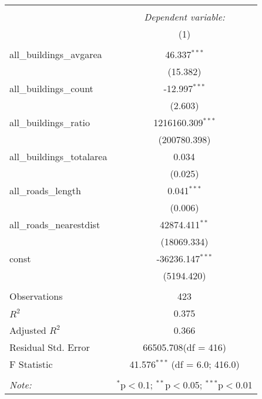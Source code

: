 \begin{table}[!htbp] \centering
\begin{tabular}{@{\extracolsep{5pt}}lc}
\\[-1.8ex]\hline
\hline \\[-1.8ex]
& \multicolumn{1}{c}{\textit{Dependent variable:}} \
\cr \cline{1-2}
\\[-1.8ex] & (1) \\
\hline \\[-1.8ex]
 all_buildings_avgarea & 46.337$^{***}$ \\
  & (15.382) \\
 all_buildings_count & -12.997$^{***}$ \\
  & (2.603) \\
 all_buildings_ratio & 1216160.309$^{***}$ \\
  & (200780.398) \\
 all_buildings_totalarea & 0.034$^{}$ \\
  & (0.025) \\
 all_roads_length & 0.041$^{***}$ \\
  & (0.006) \\
 all_roads_nearestdist & 42874.411$^{**}$ \\
  & (18069.334) \\
 const & -36236.147$^{***}$ \\
  & (5194.420) \\
\hline \\[-1.8ex]
 Observations & 423 \\
 $R^2$ & 0.375 \\
 Adjusted $R^2$ & 0.366 \\
 Residual Std. Error & 66505.708(df = 416)  \\
 F Statistic & 41.576$^{***}$ (df = 6.0; 416.0) \\
\hline
\hline \\[-1.8ex]
\textit{Note:} & \multicolumn{1}{r}{$^{*}$p$<$0.1; $^{**}$p$<$0.05; $^{***}$p$<$0.01} \\
\end{tabular}
\end{table}